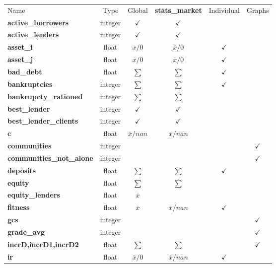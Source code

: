 \documentclass{article}
\begin{document}
\begin{table}[h]
\centering
\begin{tabular}{|l|c|c|c|c|c|}
\hline
Name & Type & Global & \textbf{stats\_market} & Individual & Graphs \\
\textbf{active\_borrowers} & integer & $\checkmark$ &  $\checkmark$  &  & \\
\textbf{active\_lenders}   & integer & $\checkmark$ & $\checkmark$  &  & \\
\textbf{asset\_i}          & float & $\overline{x}/0 $ & $\overline{x}/0$ & $\checkmark$ &  \\
\textbf{asset\_j}          & float & $\overline{x}/0 $ & $\overline{x}/0$ & $\checkmark$ &  \\
\textbf{bad\_debt}         & float & $ \sum$ &  $ \sum$ & $\checkmark$ & \\
\textbf{bankruptcies}      & integer & $ \sum$ &  $ \sum$ & $\checkmark$ &  \\
\textbf{bankrupcty\_rationed} & integer & $ \sum$ &  $ \sum$ &  &  \\
\textbf{best\_lender}      &  integer &  $\checkmark$ & $\checkmark$  &  & \\
\textbf{best\_lender\_clients}  & integer &  $\checkmark$ &  $\checkmark$ &  & \\
\textbf{c}                 & float &  $\overline{x}/nan $ & $\overline{x}/nan $ &  &  \\
\textbf{communities} & integer &  &   &  & $\checkmark$\\
\textbf{communities\_not\_alone} & integer &  &   &  & $\checkmark$ \\
\textbf{deposits}          & float & $ \sum$ &  $ \sum$ & $\checkmark$ &  \\
\textbf{equity}            & float &  $ \sum$ &  $ \sum$ &  & \\
\textbf{equity\_lenders}            & float &  $\overline{x}$ &  &  & \\
\textbf{fitness}           & float & $\overline{x}$ & $\overline{x}/nan $ &  $\checkmark$  & \\
\textbf{gcs}               & integer &  &   &  & $\checkmark$ \\
\textbf{grade\_avg}        & integer &  &   &  & $\checkmark$\\
\textbf{incrD,incrD1,incrD2} &  float &   $\sum$  &  $\sum$  &  &  $\checkmark$  \\
\textbf{ir}                &  float &  $\overline{x}/0$ & $\overline{x} / nan $  & $\checkmark$ &  \\

\end{tabular}
\end{table}
\end{document}
